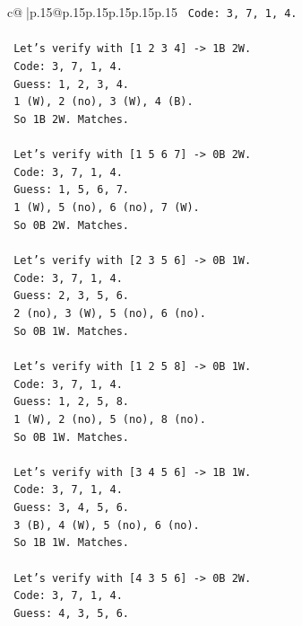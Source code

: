 \documentclass{article}
\begin{document}
{\begin{supertabular}{c@{$\;$}|p{.15\linewidth}@{}p{.15\linewidth}p{.15\linewidth}p{.15\linewidth}p{.15\linewidth}p{.15\linewidth}}
{{{\texttt{   Code: 3, 7, 1, 4.} \\
\\ 
\texttt{   Let's verify with {[}1 2 3 4{]} {-}> 1B 2W.} \\
\texttt{   Code: 3, 7, 1, 4.} \\
\texttt{   Guess: 1, 2, 3, 4.} \\
\texttt{   1 (W), 2 (no), 3 (W), 4 (B).} \\
\texttt{   So 1B 2W. Matches.} \\
\\ 
\texttt{   Let's verify with {[}1 5 6 7{]} {-}> 0B 2W.} \\
\texttt{   Code: 3, 7, 1, 4.} \\
\texttt{   Guess: 1, 5, 6, 7.} \\
\texttt{   1 (W), 5 (no), 6 (no), 7 (W).} \\
\texttt{   So 0B 2W. Matches.} \\
\\ 
\texttt{   Let's verify with {[}2 3 5 6{]} {-}> 0B 1W.} \\
\texttt{   Code: 3, 7, 1, 4.} \\
\texttt{   Guess: 2, 3, 5, 6.} \\
\texttt{   2 (no), 3 (W), 5 (no), 6 (no).} \\
\texttt{   So 0B 1W. Matches.} \\
\\ 
\texttt{   Let's verify with {[}1 2 5 8{]} {-}> 0B 1W.} \\
\texttt{   Code: 3, 7, 1, 4.} \\
\texttt{   Guess: 1, 2, 5, 8.} \\
\texttt{   1 (W), 2 (no), 5 (no), 8 (no).} \\
\texttt{   So 0B 1W. Matches.} \\
\\ 
\texttt{   Let's verify with {[}3 4 5 6{]} {-}> 1B 1W.} \\
\texttt{   Code: 3, 7, 1, 4.} \\
\texttt{   Guess: 3, 4, 5, 6.} \\
\texttt{   3 (B), 4 (W), 5 (no), 6 (no).} \\
\texttt{   So 1B 1W. Matches.} \\
\\ 
\texttt{   Let's verify with {[}4 3 5 6{]} {-}> 0B 2W.} \\
\texttt{   Code: 3, 7, 1, 4.} \\
\texttt{   Guess: 4, 3, 5, 6.} \\
}}}
\end{supertabular}}
\end{document}
